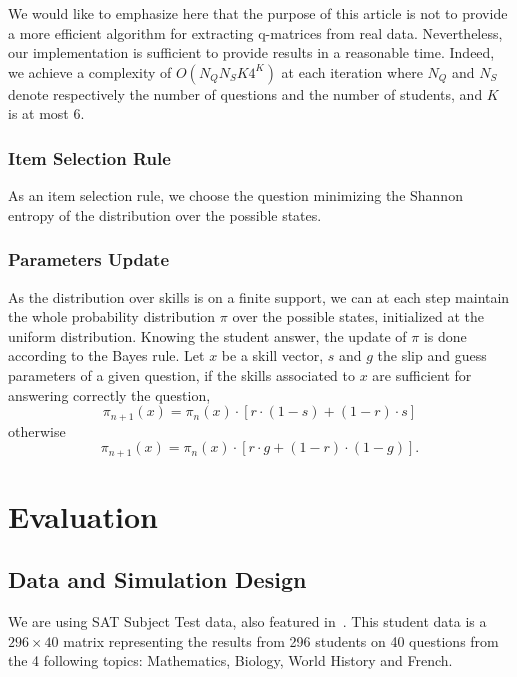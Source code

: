 \documentclass{sig-alternate}
\newcommand\alert[1]{\textcolor{red}{#1}}
\begin{document}

We would like to emphasize here that the purpose of this article is not to provide a more efficient algorithm for extracting q-matrices from real data. Nevertheless, our implementation is sufficient to provide results in a reasonable time. Indeed, we achieve a complexity of $O(N_Q N_S K 4^K)$ at each iteration where $N_Q$ and $N_S$ denote respectively the number of questions and the number of students, and $K$ is at most 6.

\subsubsection{Item Selection Rule}

As an item selection rule, we choose the question minimizing the Shannon entropy of the distribution over the possible states.

\subsubsection{Parameters Update}

As the distribution over skills is on a finite support, we can at each step maintain the whole probability distribution $\pi$ over the possible states, initialized at the uniform distribution.
Knowing the student answer, the update of $\pi$ is done according to the Bayes rule. Let $x$ be a skill vector, $s$ and $g$ the slip and guess parameters of a given question, if the skills associated to $x$ are sufficient for answering correctly the question,
\[ \pi_{n+1}(x) = \pi_n(x) \cdot [r\cdot(1-s) + (1-r)\cdot s] \]
otherwise
\[ \pi_{n+1}(x) = \pi_n(x) \cdot [r\cdot g + (1-r)\cdot(1-g)]. \]

\section{Evaluation}

\subsection{Data and Simulation Design} %

We are using SAT Subject Test data, also featured in~\citep{Winters2005, Desmarais2011}. This student data is a $296 \times 40$ matrix representing the results from 296 students on 40 questions from the 4 following topics: Mathematics, Biology, World History and French.
\end{document}
